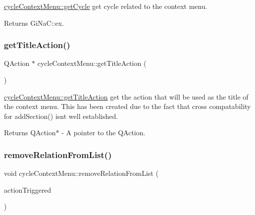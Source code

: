 \mbox{\hyperlink{classcycle_context_menu_a35b3868cdc32b97e7c4abc109ee13460}{cycle\+Context\+Menu\+::get\+Cycle}} get cycle related to the context menu. 

\begin{DoxyReturn}{Returns}
Gi\+Na\+C\+::ex. 
\end{DoxyReturn}
\mbox{\label{classcycle_context_menu_a0e955d1a633d3585d11b7c193341a568}} 
\subsubsection{\texorpdfstring{get\+Title\+Action()}{getTitleAction()}}
{\footnotesize\ttfamily Q\+Action $\ast$ cycle\+Context\+Menu\+::get\+Title\+Action (\begin{DoxyParamCaption}{ }\end{DoxyParamCaption})}



\mbox{\hyperlink{classcycle_context_menu_a0e955d1a633d3585d11b7c193341a568}{cycle\+Context\+Menu\+::get\+Title\+Action}} get the action that will be used as the title of the context menu. This has been created due to the fact that cross compatability for \textquotesingle{}add\+Section()\textquotesingle{} isn\textquotesingle{}t well established. 

\begin{DoxyReturn}{Returns}
Q\+Action$\ast$ -\/ A pointer to the Q\+Action. 
\end{DoxyReturn}
\mbox{\label{classcycle_context_menu_a83f3eb1ea5338154095a7bf1e2c77b01}} 
\subsubsection{\texorpdfstring{remove\+Relation\+From\+List()}{removeRelationFromList()}}
{\footnotesize\ttfamily void cycle\+Context\+Menu\+::remove\+Relation\+From\+List (\begin{DoxyParamCaption}\item[{\mbox{\hyperlink{classmenu_rel_action}{menu\+Rel\+Action}} $\ast$}]{action\+Triggered }\end{DoxyParamCaption})}



